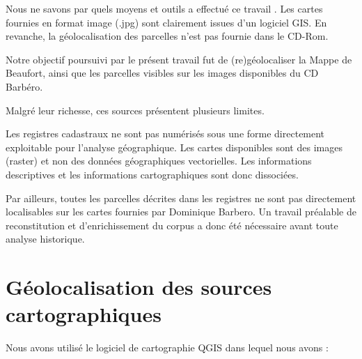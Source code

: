 \documentclass[12pt,a4paper]{report}
\begin{document}
Nous ne savons par quels moyens et outils a effectué ce travail . Les cartes fournies en format image (.jpg) sont clairement issues d’un logiciel GIS. 
En revanche, la géolocalisation des parcelles n’est pas fournie dans le CD-Rom.

Notre objectif poursuivi par le présent travail fut  de (re)géolocaliser la Mappe de Beaufort, ainsi que les parcelles visibles sur les images disponibles du CD Barbéro. 

\medskip

Malgré leur richesse, ces sources présentent plusieurs limites.

Les registres cadastraux ne sont pas numérisés sous une forme directement exploitable pour l'analyse géographique. Les cartes disponibles sont des images (raster) et non des données géographiques vectorielles. Les informations descriptives et les informations cartographiques sont donc dissociées.

Par ailleurs, toutes les parcelles décrites dans les registres ne sont pas directement localisables sur les cartes fournies par Dominique Barbero. Un travail préalable de reconstitution et d'enrichissement du corpus a donc été nécessaire avant toute analyse historique.


\section{Géolocalisation des sources cartographiques}

Nous avons utilisé le logiciel de cartographie QGIS dans lequel nous avons :
\end{document}

